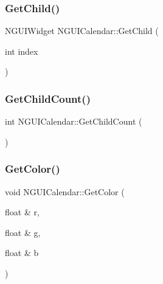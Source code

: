\hypertarget{class_n_g_u_i_calendar_a4cb0fa2fde73992b9f7c42f071f484bb}{}\label{class_n_g_u_i_calendar_a4cb0fa2fde73992b9f7c42f071f484bb} 
\subsubsection{\texorpdfstring{Get\+Child()}{GetChild()}\hspace{0.1cm}{\footnotesize\ttfamily [2/2]}}
{\footnotesize\ttfamily N\+G\+U\+I\+Widget N\+G\+U\+I\+Calendar\+::\+Get\+Child (\begin{DoxyParamCaption}\item[{int}]{index }\end{DoxyParamCaption})}

\hypertarget{class_n_g_u_i_calendar_aa17d04f3ef60ac010eae4fdb667336ab}{}\label{class_n_g_u_i_calendar_aa17d04f3ef60ac010eae4fdb667336ab} 
\subsubsection{\texorpdfstring{Get\+Child\+Count()}{GetChildCount()}}
{\footnotesize\ttfamily int N\+G\+U\+I\+Calendar\+::\+Get\+Child\+Count (\begin{DoxyParamCaption}{ }\end{DoxyParamCaption})}

\hypertarget{class_n_g_u_i_calendar_ac877db8547c81c63eccc75ed7c5656e5}{}\label{class_n_g_u_i_calendar_ac877db8547c81c63eccc75ed7c5656e5} 
\subsubsection{\texorpdfstring{Get\+Color()}{GetColor()}}
{\footnotesize\ttfamily void N\+G\+U\+I\+Calendar\+::\+Get\+Color (\begin{DoxyParamCaption}\item[{float \&}]{r,  }\item[{float \&}]{g,  }\item[{float \&}]{b }\end{DoxyParamCaption})}

